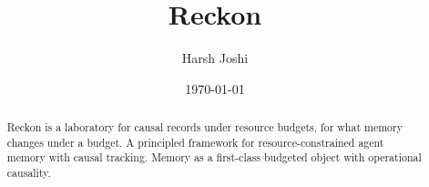 \documentclass[twocolumn]{article}
\title{Reckon}
\author{Harsh Joshi}
\date{\today}
\begin{document}
\maketitle

\begin{abstract}
Reckon is a laboratory for causal records under resource budgets, for what memory changes under a budget.
A principled framework for resource-constrained agent memory with causal tracking.
Memory as a first-class budgeted object with operational causality.
\end{abstract}



\end{document}
